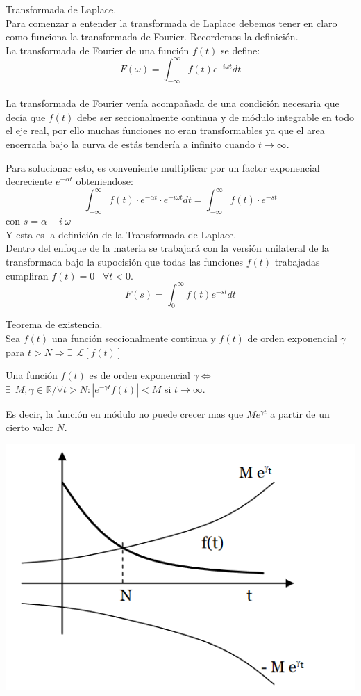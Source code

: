 \documentclass[]{article}
\begin{document}
\huge Transformada de Laplace.
\\

\normalsize Para comenzar a entender la transformada de Laplace debemos tener en claro como funciona la transformada de Fourier. Recordemos la definición.
\\
La transformada de Fourier de una función $f(t)$ se define:
$$
F(\omega) = \int_{-\infty}^{\infty}f(t)e^{-i\omega t} dt 
$$
\\
La transformada de Fourier venía acompañada de una condición necesaria que decía que $f(t)$ debe ser seccionalmente continua y de módulo integrable en todo el eje real, por ello muchas funciones no eran transformables ya que el area encerrada bajo la curva de estás tendería a infinito cuando $t\rightarrow \infty$.

Para solucionar esto, es conveniente multiplicar por un factor exponencial decreciente $e^{-\alpha t }$ obteniendose:
$$
\int_{-\infty}^{\infty} f(t) \cdot  e^{-\alpha t}\cdot  e^{-i\omega t}dt =
\int_{-\infty}^{\infty} f(t) \cdot  e^{-st}
$$
con $s=\alpha + i \hspace{3pt} \omega $
\\ Y esta es la definición de la Transformada de Laplace.
\\ Dentro del enfoque de la materia se trabajará con la versión unilateral de la transformada bajo la supocisión que todas las funciones $f(t)$ trabajadas cumpliran 
$f(t) = 0  \hspace{10pt} \forall t < 0$.
$$
F(s) = \int_{0}^{\infty} f(t) e^{-st} dt
$$

\large Teorema de existencia.
\\

\normalsize Sea $f(t)$ una función seccionalmente continua y $f(t)$ de orden exponencial $\gamma$ para $t > N \Rightarrow \exists \hspace{5pt} \mathscr{L}[f(t)]$

Una función $f(t)$ es de orden exponencial $\gamma \Longleftrightarrow$ ${\exists \hspace{5pt} M,\gamma \in \mathbb{R}  / \forall t > N: |e^{-\gamma t} f(t)| < M }$ si $t \rightarrow \infty$.

Es decir, la función en módulo no puede crecer mas que $Me^{\gamma t}$ a partir de un cierto valor $N$.


\includegraphics{../../../Imagenes/Superior/Superior01.PNG}
\end{document}
